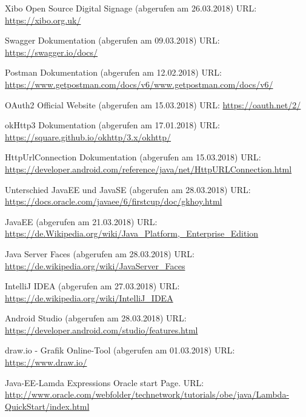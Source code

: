 \begin{thebibliography}{9}

Xibo Open Source Digital Signage (abgerufen am 26.03.2018)
\newblock URL: {\small \url{https://xibo.org.uk/}}

Swagger Dokumentation (abgerufen am 09.03.2018)
\newblock URL: {\small \url{https://swagger.io/docs/}}

Postman Dokumentation (abgerufen am 12.02.2018)
\newblock URL: {\small \url{https://www.getpostman.com/docs/v6/www.getpostman.com/docs/v6/}}

OAuth2 Official Website (abgerufen am 15.03.2018)
\newblock URL: {\small \url{https://oauth.net/2/}}

okHttp3 Dokumentation (abgerufen am 17.01.2018)
\newblock URL: {\small \url{https://square.github.io/okhttp/3.x/okhttp/}}

HttpUrlConnection Dokumentation (abgerufen am 15.03.2018)
\newblock URL: {\small \url{https://developer.android.com/reference/java/net/HttpURLConnection.html}}

Unterschied JavaEE und JavaSE (abgerufen am 28.03.2018)
\newblock URL: {\small \url{https://docs.oracle.com/javaee/6/firstcup/doc/gkhoy.html}}

JavaEE (abgerufen am 21.03.2018)
\newblock URL: {\small \url{https://de.Wikipedia.org/wiki/Java_Platform,_Enterprise_Edition}}

Java Server Faces (abgerufen am 28.03.2018)
\newblock URL: {\small \url{https://de.wikipedia.org/wiki/JavaServer_Faces}}

IntelliJ IDEA (abgerufen am 27.03.2018)
\newblock URL: {\small \url{https://de.wikipedia.org/wiki/IntelliJ_IDEA}}

Android Studio (abgerufen am 28.03.2018)
\newblock URL: {\small \url{https://developer.android.com/studio/features.html}}

draw.io - Grafik Online-Tool (abgerufen am 01.03.2018)
\newblock URL: {\small \url{https://www.draw.io/}}

Java-EE-Lamda Expressions Oracle start Page.
\newblock URL: {\small \url{http://www.oracle.com/webfolder/technetwork/tutorials/obe/java/Lambda-QuickStart/index.html}}


\end{thebibliography}